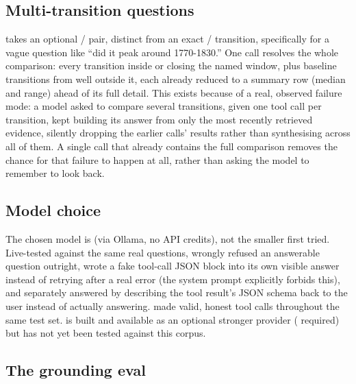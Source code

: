 \documentclass[11pt]{article}
\begin{document}
\subsection{Multi-transition questions}

 takes an optional
/ pair, distinct from an exact
/ transition, specifically for a
vague question like ``did it peak around 1770-1830.'' One call resolves
the whole comparison: every transition inside or closing the named
window, plus baseline transitions from well outside it, each already
reduced to a summary row (median and range) ahead of its full detail.
This exists because of a real, observed failure mode: a model asked to
compare several transitions, given one tool call per transition, kept
building its answer from only the most recently retrieved evidence,
silently dropping the earlier calls' results rather than synthesising
across all of them. A single call that already contains the full
comparison removes the chance for that failure to happen at all,
rather than asking the model to remember to look back.

\subsection{Model choice}

The chosen model is  (via Ollama, no API credits),
not the smaller  first tried. Live-tested against
the same real questions,  wrongly refused an
answerable question outright, wrote a fake tool-call JSON block into
its own visible answer instead of retrying after a real error (the
system prompt explicitly forbids this), and separately answered by
describing the tool result's JSON schema back to the user instead of
actually answering.  made valid, honest tool calls
throughout the same test set.  is built and
available as an optional stronger provider (
required) but has not yet been tested against this corpus.

\subsection{The grounding eval}
\end{document}
